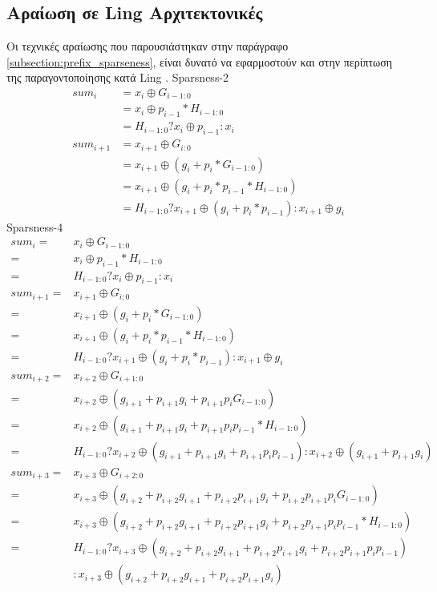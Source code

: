 \subsection{Αραίωση σε Ling Αρχιτεκτονικές}
Οι τεχνικές αραίωσης που παρουσιάστηκαν στην παράγραφο \ref{subsection:prefix_sparseness},
 είναι δυνατό να εφαρμοστούν και στην περίπτωση της παραγοντοποίησης κατά
 Ling \cite{Sparseness_ling}.
Sparsness-2
\begin{equation*}
    \begin{split}
        sum_i &= x_i \oplus G_{i-1:0}\\
              &= x_i \oplus p_{i-1}*H_{i-1:0}\\
              &= H_{i-1:0} ? x_i \oplus p_{i-1} : x_i\\
        sum_{i+1} &= x_{i+1} \oplus G_{i:0}\\
                  &= x_{i+1} \oplus (g_i + p_i*G_{i-1:0})\\
                  &= x_{i+1} \oplus (g_i + p_i*p_{i-1}*H_{i-1:0})\\
                  &= H_{i-1:0} ? x_{i+1} \oplus (g_i + p_i*p_{i-1}) : x_{i+1} \oplus g_i
    \end{split} 
\end{equation*}
Sparsness-4
\begin{equation*}
    \begin{split}
        sum_i =& x_i \oplus G_{i-1:0}\\
        =& x_i \oplus p_{i-1}*H_{i-1:0}\\
        =& H_{i-1:0} ? x_i \oplus p_{i-1} : x_i\\
        sum_{i+1} =& x_{i+1} \oplus G_{i:0}\\
        =& x_{i+1} \oplus (g_i + p_i*G_{i-1:0})\\
        =& x_{i+1} \oplus (g_i + p_i*p_{i-1}*H_{i-1:0})\\
        =& H_{i-1:0} ? x_{i+1} \oplus (g_i + p_i*p_{i-1}) : x_{i+1} \oplus g_i\\
        sum_{i+2} =& x_{i+2} \oplus G_{i+1:0}\\
        =& x_{i+2} \oplus (g_{i+1} + p_{i+1}g_i + p_{i+1}p_iG_{i-1:0})\\
        =& x_{i+2} \oplus (g_{i+1} + p_{i+1}g_i + p_{i+1}p_ip_{i-1}*H_{i-1:0})\\
        =& H_{i-1:0} ? x_{i+2} \oplus (g_{i+1} + p_{i+1}g_i + p_{i+1}p_ip_{i-1}) : x_{i+2} \oplus (g_{i+1} + p_{i+1}g_i)\\
        sum_{i+3} =& x_{i+3} \oplus G_{i+2:0}\\
        =& x_{i+3} \oplus (g_{i+2} + p_{i+2}g_{i+1} + p_{i+2}p_{i+1}g_i + p_{i+2}p_{i+1}p_iG_{i-1:0})\\
        =& x_{i+3} \oplus (g_{i+2} + p_{i+2}g_{i+1} + p_{i+2}p_{i+1}g_i + p_{i+2}p_{i+1}p_ip_{i-1}*H_{i-1:0})\\
        =& H_{i-1:0} ? x_{i+3} \oplus (g_{i+2} + p_{i+2}g_{i+1} + p_{i+2}p_{i+1}g_i + p_{i+2}p_{i+1}p_ip_{i-1}) \\&: x_{i+3} \oplus (g_{i+2} + p_{i+2}g_{i+1} + p_{i+2}p_{i+1}g_i)
    \end{split} 
\end{equation*}

 
 